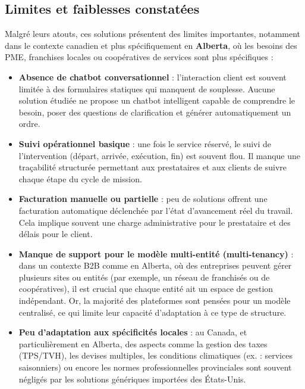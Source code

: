 \subsection*{Limites et faiblesses constatées}

Malgré leurs atouts, ces solutions présentent des limites importantes, notamment dans le contexte canadien et plus spécifiquement en \textbf{Alberta}, où les besoins des PME, franchises locales ou coopératives de services sont plus spécifiques :

\begin{itemize}
  \item \textbf{Absence de chatbot conversationnel} : l’interaction client est souvent limitée à des formulaires statiques qui manquent de souplesse. Aucune solution étudiée ne propose un chatbot intelligent capable de comprendre le besoin, poser des questions de clarification et générer automatiquement un ordre.
  
  \item \textbf{Suivi opérationnel basique} : une fois le service réservé, le suivi de l’intervention (départ, arrivée, exécution, fin) est souvent flou. Il manque une traçabilité structurée permettant aux prestataires et aux clients de suivre chaque étape du cycle de mission.

  \item \textbf{Facturation manuelle ou partielle} : peu de solutions offrent une facturation automatique déclenchée par l’état d’avancement réel du travail. Cela implique souvent une charge administrative pour le prestataire et des délais pour le client.

  \item \textbf{Manque de support pour le modèle multi-entité (multi-tenancy)} : dans un contexte B2B comme en Alberta, où des entreprises peuvent gérer plusieurs sites ou entités (par exemple, un réseau de franchisés ou de coopératives), il est crucial que chaque entité ait un espace de gestion indépendant. Or, la majorité des plateformes sont pensées pour un modèle centralisé, ce qui limite leur capacité d’adaptation à ce type de structure.

  \item \textbf{Peu d’adaptation aux spécificités locales} : au Canada, et particulièrement en Alberta, des aspects comme la gestion des taxes (TPS/TVH), les devises multiples, les conditions climatiques (ex. : services saisonniers) ou encore les normes professionnelles provinciales sont souvent négligés par les solutions génériques importées des États-Unis.
\end{itemize}

